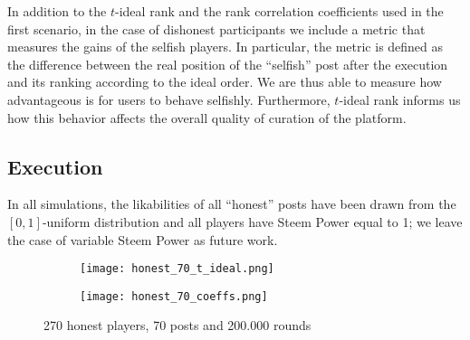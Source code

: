 %
    In addition to the $t$-ideal rank and the rank correlation coefficients used
    in the first scenario, in the case of dishonest participants we include a
    metric that measures the gains of the selfish players. In particular, the
    metric is defined as the difference between the real position of the
    ``selfish'' post after the execution and its ranking according to the ideal
    order. We are thus able to measure how advantageous is for users to behave
    selfishly. Furthermore, $t$-ideal rank informs us how this behavior affects
    the overall quality of curation of the platform.

  \subsection{Execution}
    In all simulations, the likabilities of all ``honest'' posts have been drawn
    from the $\left[0, 1\right]$-uniform distribution and all players have Steem
    Power equal to 1; we leave the case of variable Steem Power as future work.

    \begin{figure}[h]
      \begin{subfigure}[t]{0.5\textwidth}
        \centering
        \texttt{[image: honest\_70\_t\_ideal.png]}
        \label{fig:honest:70:tideal}
      \end{subfigure}\hfill
      \begin{subfigure}[t]{0.5\textwidth}
        \centering
        \texttt{[image: honest\_70\_coeffs.png]}
        \label{fig:honest:70:coeffs}
      \end{subfigure}
      \caption{270 honest players, 70 posts and 200.000 rounds}
    \end{figure}

